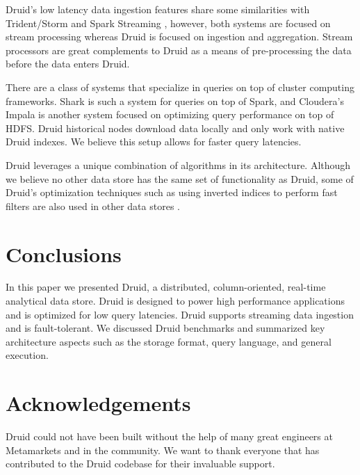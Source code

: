 \documentclass{sig-alternate-2013}
\begin{document}
Druid's low latency data ingestion features share some similarities with
Trident/Storm \cite{marz2013storm} and Spark Streaming
\cite{zaharia2012discretized}, however, both systems are focused on stream
processing whereas Druid is focused on ingestion and aggregation. Stream
processors are great complements to Druid as a means of pre-processing the data
before the data enters Druid.

There are a class of systems that specialize in queries on top of cluster
computing frameworks. Shark \cite{engle2012shark} is such a system for queries
on top of Spark, and Cloudera's Impala \cite{cloudera2013} is another system
focused on optimizing query performance on top of HDFS. Druid historical nodes
download data locally and only work with native Druid indexes. We believe this
setup allows for faster query latencies.

Druid leverages a unique combination of algorithms in its
architecture. Although we believe no other data store has the same set
of functionality as Druid, some of Druid’s optimization techniques such as using
inverted indices to perform fast filters are also used in other data
stores \cite{macnicol2004sybase}.

\section{Conclusions}
\label{sec:conclusions}
In this paper we presented Druid, a distributed, column-oriented, real-time
analytical data store. Druid is designed to power high performance applications
and is optimized for low query latencies. Druid supports streaming data
ingestion and is fault-tolerant. We discussed Druid benchmarks and
summarized key architecture aspects such
as the storage format, query language, and general execution.

\balance

\section{Acknowledgements}
\label{sec:acknowledgements}
Druid could not have been built without the help of many great engineers at
Metamarkets and in the community. We want to thank everyone that has
contributed to the Druid codebase for their invaluable support.




\end{document}
